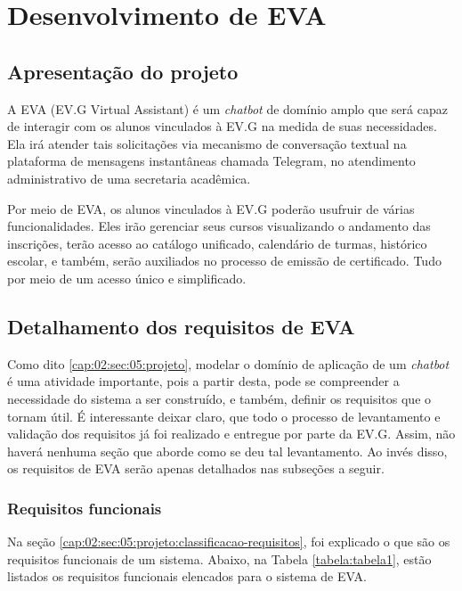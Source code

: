 \chapter{Desenvolvimento de EVA}

\section{Apresentação do projeto}


A EVA (EV.G Virtual Assistant) é um \textit{chatbot} de domínio amplo que será capaz de interagir com os alunos vinculados à EV.G na medida de suas necessidades.
Ela irá atender tais solicitações via mecanismo de conversação textual na plataforma de mensagens instantâneas chamada Telegram, no atendimento administrativo de uma secretaria acadêmica.

Por meio de EVA, os alunos vinculados à EV.G poderão usufruir de várias funcionalidades.
Eles irão gerenciar seus cursos visualizando o andamento das inscrições, 
terão acesso ao catálogo unificado, calendário de turmas, histórico escolar, 
e também, serão auxiliados no processo de emissão de certificado. 
Tudo por meio de um acesso único e simplificado.

\section{Detalhamento dos requisitos de EVA}\label{especificacao-requisitos-eva}

Como dito \ref{cap:02:sec:05:projeto}, modelar o domínio de aplicação de um \textit{chatbot} é uma atividade importante, pois a partir desta, pode se compreender a necessidade do sistema a ser construído, e também, definir os requisitos que o tornam útil.
É interessante deixar claro, que todo o processo de levantamento e validação dos requisitos já foi realizado e entregue por parte da EV.G. 
Assim, não haverá nenhuma seção que aborde como se deu tal levantamento. 
Ao invés disso, os requisitos de EVA serão apenas detalhados nas subseções a seguir.

\subsection{Requisitos funcionais}

Na seção \ref{cap:02:sec:05:projeto:classificacao-requisitos}, foi explicado o que são os requisitos funcionais de um sistema. 
Abaixo, na Tabela \ref{tabela:tabela1}, estão listados os requisitos funcionais elencados para o sistema de EVA.

